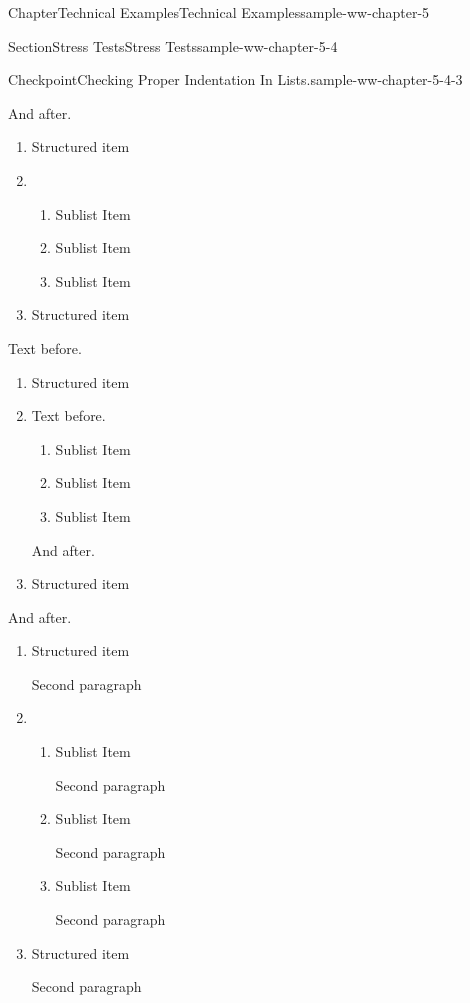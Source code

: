 \documentclass[oneside,10pt,]{book}
\numberwithin{equation}{section}
\begin{document}
\begin{chapterptx}{Chapter}{Technical Examples}{}{Technical Examples}{}{}{sample-ww-chapter-5}
\begin{sectionptx}{Section}{Stress Tests}{}{Stress Tests}{}{}{sample-ww-chapter-5-4}
\begin{inlineexercise}{Checkpoint}{Checking Proper Indentation In Lists.}{sample-ww-chapter-5-4-3}
\begin{enumerate}[label={\alph*.}]
\end{enumerate}
%
\par
And after.%
\par
%
\begin{enumerate}[label={\alph*.}]
\item{}Structured item%
\item{}~%
\begin{enumerate}[label={\Alph*.}]
\item{}Sublist Item%
\item{}Sublist Item%
\item{}Sublist Item%
\end{enumerate}
%
\item{}Structured item%
\end{enumerate}
%
\par
Text before.%
\begin{enumerate}[label={\alph*.}]
\item{}Structured item%
\item{}Text before.%
\begin{enumerate}[label={\roman*.}]
\item{}Sublist Item%
\item{}Sublist Item%
\item{}Sublist Item%
\end{enumerate}
%
\par
And after.%
\item{}Structured item%
\end{enumerate}
%
\par
And after.%
\par
%
\begin{enumerate}[label={\alph*.}]
\item{}Structured item%
\par
Second paragraph%
\item{}~%
\begin{enumerate}[label={\Roman*.}]
\item{}Sublist Item%
\par
Second paragraph%
\item{}Sublist Item%
\par
Second paragraph%
\item{}Sublist Item%
\par
Second paragraph%
\end{enumerate}
%
\item{}Structured item%
\par
Second paragraph%
\end{enumerate}
%
\par

\end{inlineexercise}
\end{sectionptx}
\end{chapterptx}
\end{document}
